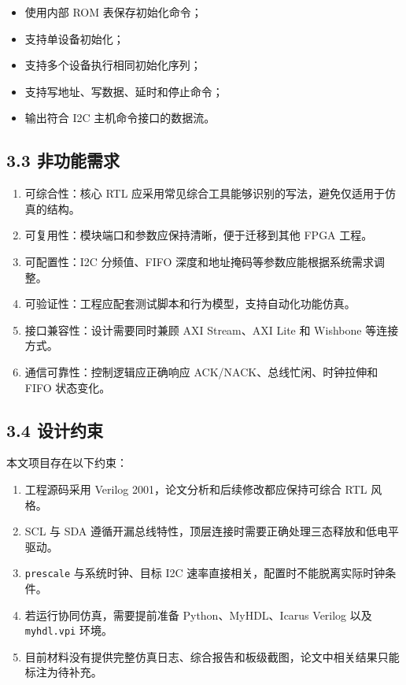 \begin{itemize}
\tightlist
\item
  使用内部 ROM 表保存初始化命令；
\item
  支持单设备初始化；
\item
  支持多个设备执行相同初始化序列；
\item
  支持写地址、写数据、延时和停止命令；
\item
  输出符合 I2C 主机命令接口的数据流。
\end{itemize}

\subsection{3.3 非功能需求}\label{ux975eux529fux80fdux9700ux6c42}

\begin{enumerate}
\def\labelenumi{\arabic{enumi}.}
\tightlist
\item
  可综合性：核心 RTL
  应采用常见综合工具能够识别的写法，避免仅适用于仿真的结构。
\item
  可复用性：模块端口和参数应保持清晰，便于迁移到其他 FPGA 工程。
\item
  可配置性：I2C 分频值、FIFO 深度和地址掩码等参数应能根据系统需求调整。
\item
  可验证性：工程应配套测试脚本和行为模型，支持自动化功能仿真。
\item
  接口兼容性：设计需要同时兼顾 AXI Stream、AXI Lite 和 Wishbone
  等连接方式。
\item
  通信可靠性：控制逻辑应正确响应 ACK/NACK、总线忙闲、时钟拉伸和 FIFO
  状态变化。
\end{enumerate}

\subsection{3.4 设计约束}\label{ux8bbeux8ba1ux7ea6ux675f}

本文项目存在以下约束：

\begin{enumerate}
\def\labelenumi{\arabic{enumi}.}
\tightlist
\item
  工程源码采用 Verilog 2001，论文分析和后续修改都应保持可综合 RTL 风格。
\item
  SCL 与 SDA
  遵循开漏总线特性，顶层连接时需要正确处理三态释放和低电平驱动。
\item
  \texttt{prescale} 与系统时钟、目标 I2C
  速率直接相关，配置时不能脱离实际时钟条件。
\item
  若运行协同仿真，需要提前准备 Python、MyHDL、Icarus Verilog 以及
  \texttt{myhdl.vpi} 环境。
\item
  目前材料没有提供完整仿真日志、综合报告和板级截图，论文中相关结果只能标注为待补充。
\end{enumerate}

